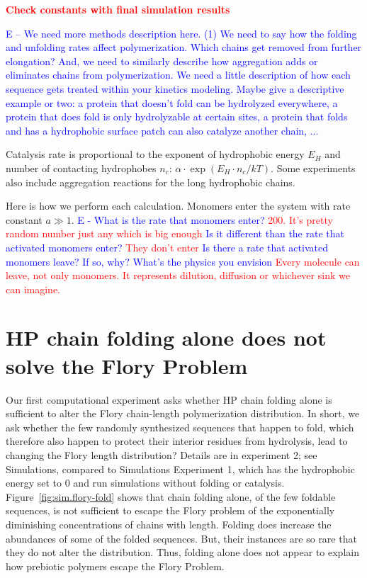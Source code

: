 \documentclass[journal=jacsat,manuscript=article,layout=twocolumn]{achemso}
\newcommand*{\ga}{\alpha}
\newcommand*{\red}[1]{\textcolor{red}{#1}}
\newcommand*{\blue}[1]{\textcolor{blue}{#1}}
\begin{document}
\red{\textbf{Check constants with final simulation results}}

\blue{E -- We need more methods description here.  (1) We need to say how the folding and 
unfolding rates affect polymerization.  Which chains get removed from further elongation?  And, we 
need to similarly describe how aggregation adds or eliminates chains from polymerization.  We need a 
little description of how each sequence gets treated within your kinetics modeling.  Maybe give a 
descriptive example or two: a protein that doesn't fold can be hydrolyzed everywhere, a protein that 
does fold is only hydrolyzable at certain sites, a protein that folds and has a hydrophobic surface 
patch can also catalyze another chain, ...}

Catalysis rate is proportional to the exponent of hydrophobic energy $E_H$ and number of 
contacting hydrophobes $n_c$: $\ga\cdot\exp(E_{H}\cdot n_{c}/kT)$. Some experiments also include 
aggregation reactions for the long hydrophobic chains.

Here is how we perform each calculation.  Monomers enter the system with rate constant $a\gg1$.  
\blue{E - What is the rate that monomers enter? }\red{200. It's pretty random number just 
any which is big enough} \blue{Is it different than the rate that activated monomers enter?} 
\red{They don't enter}  \blue{Is there a rate that activated monomers leave?  If so, why? What's the 
physics you envision } \red{Every molecule can leave, not only monomers. It represents dilution, 
diffusion or whichever sink we can imagine.}
 



\section{HP chain folding alone does not solve the Flory Problem}
Our first computational experiment asks whether HP chain folding alone is sufficient to 
alter the Flory chain-length polymerization distribution.  In short, we ask whether the few randomly 
synthesized sequences that happen to fold, which therefore also happen to protect their interior 
residues from hydrolysis, lead to changing the Flory length distribution?  Details are in 
experiment 
2; see Simulations, compared to Simulations  Experiment 1, which has the 
hydrophobic energy set to 0 and run simulations without folding or catalysis.  
Figure~\ref{fig:sim.flory-fold} 
shows that chain folding alone, of the few foldable sequences, is not sufficient to escape the Flory 
problem of the exponentially diminishing concentrations of chains with length.  Folding does 
increase the abundances of some of the folded sequences.  But, their instances are so rare that they 
do not alter the distribution.  Thus, folding alone does not appear to explain how prebiotic 
polymers escape the Flory Problem.
\end{document}
